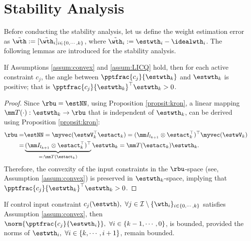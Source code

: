 \documentclass[lettersize,journal]{IEEEtran}
\begin{document}
\section{Stability Analysis}\label{sec:stability}

Before conducting the stability analysis, let us define the weight estimation error as $\tilde\wth:= [\tilde\wth_i]_{i\in\{0,\cdots,k\}}$, where $\tilde\wth_i:=\estwth_i-\idealwth_i$.
The following lemmas are introduced for the stability analysis. 

\begin{lem}
    If Assumptions \ref{assum:convex} and \ref{assum:LICQ} hold, then for each active constraint $c_j$, the angle between $\pptfrac{c_j}{\estwth_k}$ and $\estwth_k$ is positive; that is $\pptfrac{c_j}{\estwth_k}^\top\estwth_k>0$.
    \label{lem:convex:angle}
\end{lem}

\begin{proof}

Since $\rbu = \estNN$, using Proposition \ref{propsit:kron}, a linear mapping $\mm T(\cdot):\estwth_k\to\rbu$ that is independent of $\estwth_k$, can be derived using Proposition \ref{propsit:kron}:
\begin{equation}\label{eq:linear:map}
    \begin{aligned}
    \rbu 
    = 
    &
    \estNN 
    =
    \myvec(
        \estwV_k^\top \estact_k
    ) 
    = 
    (
        \mm I_{l_{k+1}}
        \otimes 
        \estact_k^\top
    )^\top
    \myvec(\estwV_k)
    \\
    = &
    \underbrace{
        (
        \mm I_{l_{k+1}}
        \otimes 
        \estact_k^\top
    )^\top}_{=:\mm T(\estact_k)}
    \estwth_k 
    =
    \mm T(\estact_k) \estwth_k.
    \end{aligned}
\end{equation}
Therefore, the convexity of the input constraints in the $\rbu$-space (see, Assumption \ref{assum:convex}) is preserved in $\estwth_k$-space, implying
that $\pptfrac{c_j}{\estwth_k}^\top\estwth_k>0$.

\end{proof}

\begin{lem} 
    If control input constraint $c_j(\estwth),\ \forall j\in\mathcal I \setminus \{\wth_i\}_{i\in\{0,\cdots,k\}}$ satisfies Assumption \ref{assum:convex}, then $\norm{\pptfrac{c_j}{\estwth_i}},\ \forall i\in\{k-1,\cdots, 0\}$, is bounded, provided the norms of $\estwth_i,\ \forall i\in\{k,\cdots, i+1\}$, remain bounded.
    \label{lem:cstr:grad:bound}
\end{lem}
\end{document}

